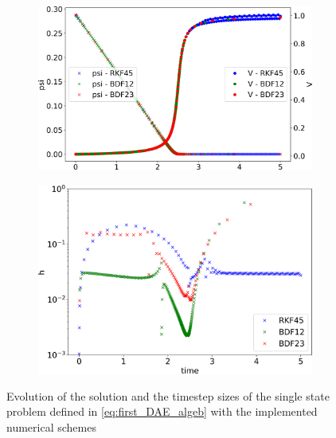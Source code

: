 \documentclass{report}
\begin{document}
\begin{figure}[H]
    \centering
    \begin{subfigure}{0.43\textwidth}
    	\centering
    	\includegraphics[width=1\textwidth]{images/timeEvolutionValues.png}
        \label{fig:timeEvolutionValues}
    \end{subfigure}
    \begin{subfigure}{0.43\textwidth}
    	\centering
    	\includegraphics[width=1\textwidth]{images/timeEvolutionDT.png}
        \label{fig:timeEvolutionDT}
    \end{subfigure}
    \caption{Evolution of the solution and the timestep sizes of the single state problem defined in \autoref{eq:first_DAE_algeb} with the implemented numerical schemes}
\end{figure}
\end{document}
